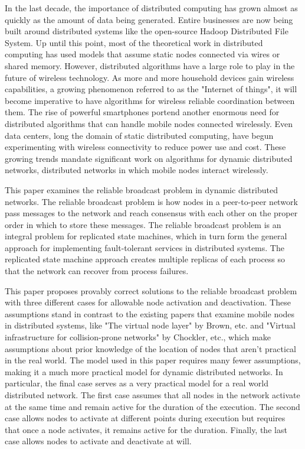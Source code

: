 \documentclass[english]{article}
\begin{document}
In the last decade, the importance of distributed computing has grown almost as quickly as the amount of data being generated. Entire businesses are now being built around distributed systems like the open-source Hadoop Distributed File System. Up until this point, most of the theoretical work in distributed computing has used models that assume static nodes connected via wires or shared memory. However, distributed algorithms have a large role to play in the future of wireless technology. As more and more household devices gain wireless capabilities, a growing phenomenon referred to as the "Internet of things", it will become imperative to have algorithms for wireless reliable coordination between them. The rise of powerful smartphones portend another enormous need for distributed algorithms that can handle mobile nodes connected wirelessly. Even data centers, long the domain of static distributed computing, have begun experimenting with wireless connectivity to reduce power use and cost. These growing trends mandate significant work on algorithms for dynamic distributed networks, distributed networks in which mobile nodes interact wirelessly.

This paper examines the reliable broadcast problem in dynamic distributed networks. The reliable broadcast problem is how nodes in a peer-to-peer network pass messages to the network and reach consensus with each other on the proper order in which to store these messages. The reliable broadcast problem is an integral problem for replicated state machines, which in turn form the general approach for implementing fault-tolerant services in distributed systems. The replicated state machine approach creates multiple replicas of each process so that the network can recover from process failures.

This paper proposes provably correct solutions to the reliable broadcast problem with three different cases for allowable node activation and deactivation. These assumptions stand in contrast to the existing papers that examine mobile nodes in distributed systems, like "The virtual node layer" by Brown, etc. and "Virtual infrastructure for collision-prone networks" by Chockler, etc., which make assumptions about prior knowledge of the location of nodes that aren't practical in the real world. The model used in this paper requires many fewer assumptions, making it a much more practical model for dynamic distributed networks. In particular, the final case serves as a very practical model for a real world distributed network. The first case assumes that all nodes in the network activate at the same time and remain active for the duration of the execution. The second case allows nodes to activate at different points during execution but requires that once a node activates, it remains active for the duration. Finally, the last case allows nodes to activate and deactivate at will.
\end{document}

